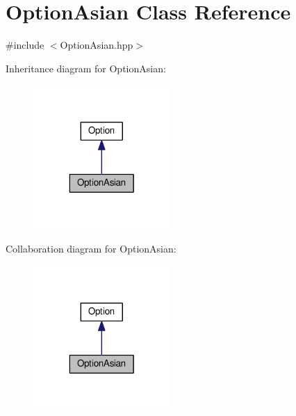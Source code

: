 \hypertarget{classOptionAsian}{\section{Option\-Asian Class Reference}
\label{classOptionAsian}
}


{\ttfamily \#include $<$Option\-Asian.\-hpp$>$}



Inheritance diagram for Option\-Asian\-:
\nopagebreak
\begin{figure}[H]
\begin{center}
\leavevmode
\includegraphics[width=148pt]{classOptionAsian__inherit__graph}
\end{center}
\end{figure}


Collaboration diagram for Option\-Asian\-:
\nopagebreak
\begin{figure}[H]
\begin{center}
\leavevmode
\includegraphics[width=148pt]{classOptionAsian__coll__graph}
\end{center}
\end{figure}
